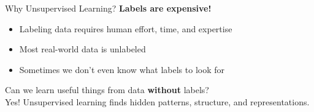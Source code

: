 \begin{frame}{Why Unsupervised Learning?}
\textbf{Labels are expensive!}

\vspace{0.5em}
\begin{itemize}
\item Labeling data requires human effort, time, and expertise
\item Most real-world data is unlabeled
\item Sometimes we don't even know what labels to look for
\end{itemize}

\vspace{1em}
\begin{tcolorbox}[colback=yellow!8, colframe=orange!60, title=\textbf{The Big Idea}]
Can we learn useful things from data \textbf{without} labels? \\
Yes! Unsupervised learning finds hidden patterns, structure, and representations.
\end{tcolorbox}

\end{frame}

